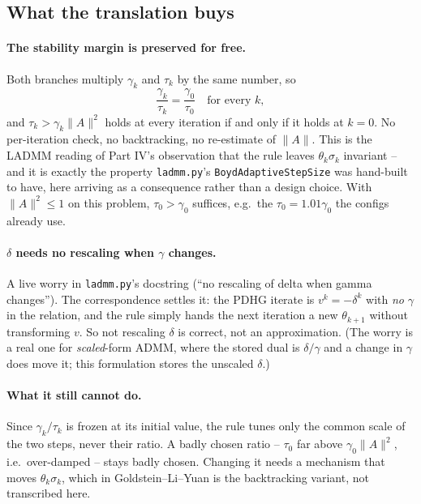 \documentclass[11pt]{article}
\newcommand{\code}[1]{\texttt{#1}}
\begin{document}
\subsection*{What the translation buys}
\paragraph{The stability margin is preserved for free.}
Both branches multiply $\gamma_k$ and $\tau_k$ by the same number, so
\[
\frac{\gamma_k}{\tau_k}=\frac{\gamma_0}{\tau_0}\quad\text{for every }k,
\]
and $\tau_k>\gamma_k\|A\|^2$ holds at every iteration if and only if it holds at
$k=0$. No per-iteration check, no backtracking, no re-estimate of $\|A\|$. This is
the LADMM reading of Part IV's observation that the rule leaves
$\theta_k\sigma_k$ invariant -- and it is exactly the property
\code{ladmm.py}'s \code{BoydAdaptiveStepSize} was hand-built to have, here
arriving as a consequence rather than a design choice. With $\|A\|^2\le1$ on this
problem, $\tau_0>\gamma_0$ suffices, e.g.\ the $\tau_0=1.01\gamma_0$ the configs
already use.

\paragraph{$\delta$ needs no rescaling when $\gamma$ changes.}
A live worry in \code{ladmm.py}'s docstring (``no rescaling of delta when gamma
changes''). The correspondence settles it: the PDHG iterate is $v^k=-\delta^k$
with \emph{no} $\gamma$ in the relation, and the rule simply hands the next
iteration a new $\theta_{k+1}$ without transforming $v$. So not rescaling
$\delta$ is correct, not an approximation. (The worry is a real one for
\emph{scaled}-form ADMM, where the stored dual is $\delta/\gamma$ and a change in
$\gamma$ does move it; this formulation stores the unscaled $\delta$.)

\paragraph{What it still cannot do.}
Since $\gamma_k/\tau_k$ is frozen at its initial value, the rule tunes only the
common scale of the two steps, never their ratio. A badly chosen ratio -- $\tau_0$
far above $\gamma_0\|A\|^2$, i.e.\ over-damped -- stays badly chosen. Changing it
needs a mechanism that moves $\theta_k\sigma_k$, which in Goldstein--Li--Yuan is
the backtracking variant, not transcribed here.
\end{document}
